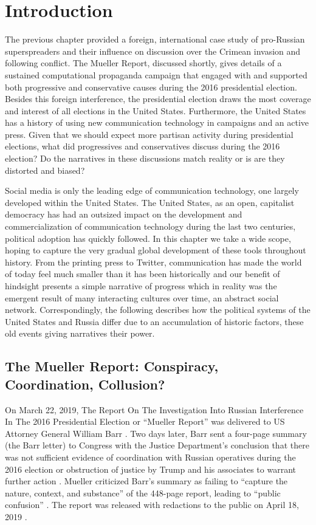 \section{Introduction}
The previous chapter provided a foreign, international case study of pro-Russian superspreaders and their influence on discussion over the Crimean invasion and following conflict.
The Mueller Report, discussed shortly, gives details of a sustained  computational propaganda campaign that engaged with and supported both progressive and conservative causes during the 2016 presidential election.
Besides this foreign interference, the presidential election draws the most coverage and interest of all elections in the United States.
Furthermore, the United States has a history of using new communication technology in campaigns and an active press.
Given that we should expect more partisan activity during presidential elections, what did progressives and conservatives discuss during the 2016 election?
Do the narratives in these discussions match reality or is are they distorted and biased?

Social media is only the leading edge of communication technology, one largely developed within the United States.
The United States, as an open, capitalist democracy has had an outsized impact on the development and commercialization of communication technology during the last two centuries, political adoption has quickly followed.
In this chapter we take a wide scope, hoping to capture the very gradual global development of these tools throughout history.
From the printing press to Twitter, communication has made the world of today feel much smaller than it has been historically and our benefit of hindsight presents a simple narrative of progress which in reality was the emergent result of many interacting cultures over time, an abstract social network.
Correspondingly, the following describes how the political systems of the United States and Russia differ due to an accumulation of historic factors, these old events giving narratives their power.

\subsection{The Mueller Report: Conspiracy, Coordination, Collusion?} 

On March 22, 2019, The Report On The Investigation Into Russian Interference In The 2016 Presidential Election or ``Mueller Report'' was delivered to US Attorney General William Barr \cite{nyt-2019}.
Two days later, Barr sent a four-page summary (the Barr letter) to Congress with the Justice Department's conclusion that there was not sufficient evidence of coordination with Russian operatives during the 2016 election or obstruction of justice by Trump and his associates to warrant further action \cite{barr-2019}.
Mueller criticized Barr's summary as failing to ``capture the nature, context, and substance'' of the 448-page report, leading to ``public confusion'' \cite{wp-2019}.
The report was released with redactions to the public on April 18, 2019 \cite{cnbc-2019}.

